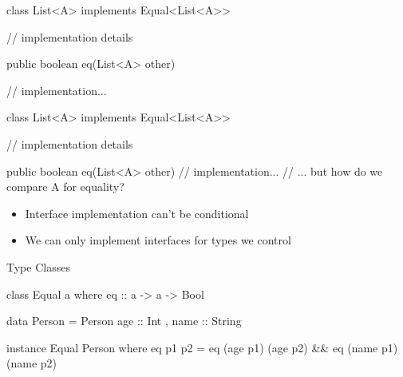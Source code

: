 \documentclass[usenames,dvipsnames,svgnames,table,aspectratio=169,mathserif]{beamer}
\newcommand{\nl}{\vspace{\baselineskip}}
\newcommand{\pnl}{\pause \nl}
\begin{document}
\begin{frame}[fragile]
\begin{javacode}
class List<A> implements Equal<List<A>> {
  // implementation details

  public boolean eq(List<A> other) {
    // implementation...

  }
}
\end{javacode}
\end{frame}


\begin{frame}[fragile]
\begin{javacode}
class List<A> implements Equal<List<A>> {
  // implementation details

  public boolean eq(List<A> other) {
    // implementation...
    // ... but how do we compare A for equality?
  }
}
\end{javacode}
\end{frame}


\begin{frame}
\begin{itemize}
\item Interface implementation can't be conditional
\item We can only implement interfaces for types we control
\end{itemize}

\end{frame}




\begin{frame}
\begin{center}
\huge{Type Classes}
\end{center}
\end{frame}


\begin{frame}[fragile]
\begin{haskellcode}
class Equal a where
  eq :: a -> a -> Bool
\end{haskellcode}

\pnl

\begin{haskellcode}
data Person = Person {
  age :: Int
, name :: String
}
\end{haskellcode}

\pnl

\begin{haskellcode}
instance Equal Person where
  eq p1 p2 = eq (age p1) (age p2) && eq (name p1) (name p2)
\end{haskellcode}

\end{frame}
\end{document}
